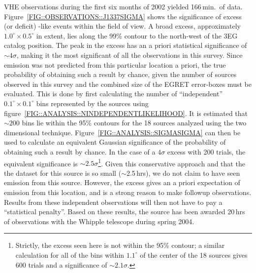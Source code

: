 VHE observations during the first six months of 2002 yielded
166\,min.\ of data. Figure~\ref{FIG::OBSERVATIONS::J1337SIGMA} shows
the significance of excess (or deficit) {\Grayc}-like events within
the field of view. A broad excess, approximately
$1.0^\circ\times0.5^\circ$ in extent, lies along the 99\% contour to
the north-west of the 3EG catalog position. The peak in the excess has
an a priori statistical significance of $\sim4\sigma$, making it the
most significant of all the observations in this survey. Since
emission was not predicted from this particular location a priori, the
true probability of obtaining such a result by chance, given the
number of sources observed in this survey and the combined size of the
EGRET error-boxes must be evaluated. This is done by first calculating
the number of ``independent'' $0.1^\circ\times0.1^\circ$ bins
represented by the sources using
figure~\ref{FIG::ANALYSIS::NINDEPENDENTLIKELIHOOD}. It is estimated
that $\sim200$ bins lie within the 95\% contours for the 18 sources
analyzed using the two dimensional
technique. Figure~\ref{FIG::ANALYSIS::SIGMASIGMA} can then be used to
calculate an equivalent Gaussian significance of the probability of
obtaining such a result by chance. In the case of a $4\sigma$ excess
with 200 trials, the equivalent significance is
$\sim2.5\sigma$\footnote{Strictly, the excess seen here is not within
the 95\% contour; a similar calculation for all of the bins within
$1.1^\circ$ of the center of the 18 sources gives 600 trials and a
significance of $\sim2.1\sigma$.}. Given this conservative approach
and that the the dataset for this source is so small ($\sim$2.5\,hrs),
we do not claim to have seen emission from this source. However, the
excess gives an a priori expectation of emission from this location,
and is a strong reason to make followup observations. Results from
these independent observations will then not have to pay a
``statistical penalty''. Based on these results, the source has been
awarded 20\,hrs of observations with the Whipple telescope during
spring 2004.

